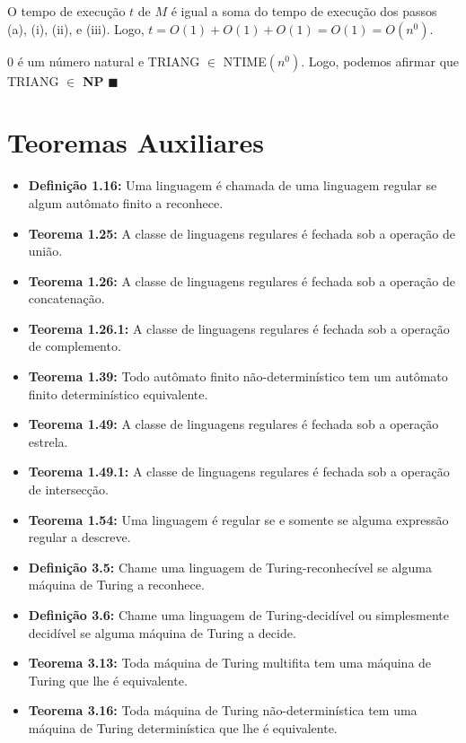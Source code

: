 \documentclass[12pt,a4paper,oneside]{article}
\begin{document}
\begin{enumerate}
{		O tempo de execução $t$ de $M$ é igual a soma do tempo de execução dos passos (a), (i), (ii), e (iii). Logo, $t = O(1) + O(1) + O(1) = O(1) = O(n^0)$. 
		
		0 é um número natural e TRIANG $\in$ {\sc NTIME}$(n^0)$. Logo, podemos afirmar que TRIANG $\in$ {\bf NP} $\blacksquare$
	}
	
	

\end{enumerate}

\section*{Teoremas Auxiliares}

\begin{itemize}
	
	\item[] {\bf Definição 1.16:} Uma linguagem é chamada de uma linguagem regular se algum autômato finito a reconhece.
	\item[] {\bf Teorema 1.25:} A classe de linguagens regulares é fechada sob a operação de união.
	\item[] {\bf Teorema 1.26:} A classe de linguagens regulares é fechada sob a operação de concatenação.
	\item[] {\bf Teorema 1.26.1:} A classe de linguagens regulares é fechada sob a operação de complemento.
	\item[] {\bf Teorema 1.39:} Todo autômato finito não-determinístico tem um autômato finito determinístico
	equivalente.
	\item[] {\bf Teorema 1.49:} A classe de linguagens regulares é fechada sob a operação estrela.
	\item[] {\bf Teorema 1.49.1:} A classe de linguagens regulares é fechada sob a operação de intersecção.
	\item[] {\bf Teorema 1.54:} Uma linguagem é regular se e somente se alguma expressão regular a descreve.
	\item[] {\bf Definição 3.5:} Chame uma linguagem de Turing-reconhecível se alguma máquina de Turing a reconhece.
	\item[] {\bf Definição 3.6:} Chame uma linguagem de Turing-decidível ou simplesmente decidível se alguma máquina de Turing a decide.
	\item[] {\bf Teorema 3.13:} Toda máquina de Turing multifita tem uma máquina de Turing que lhe é equivalente.
	\item[] {\bf Teorema 3.16:} Toda máquina de Turing não-determinística tem uma máquina de Turing determinística que lhe é equivalente.

\end{itemize}
\end{document}

